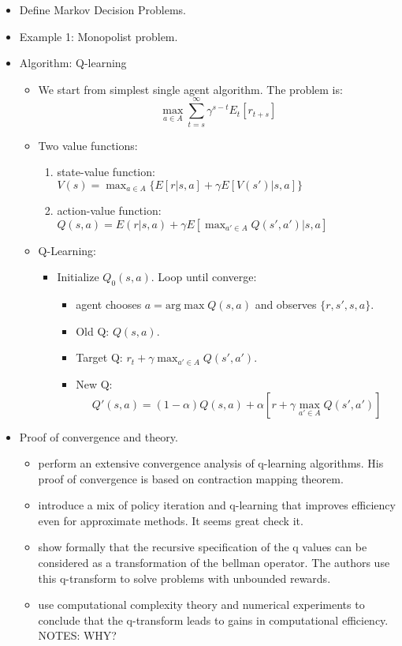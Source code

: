 \documentclass[11pt,english]{article}
\begin{document}
\begin{itemize}
\item Define Markov Decision Problems.
\item Example 1: Monopolist problem.
\item Algorithm: Q-learning
\begin{itemize}
	\item We start from simplest single agent algorithm. The problem is: \medskip
	$$\underset{a \in A}{\max} \sum_{t=s}^{\infty} \gamma^{s-t} E_t[r_{t+s}]$$
	
	\item Two value functions: \medskip
	\begin{enumerate}
		\item state-value function: $V(s)=\max_{a\in A} \{E[r|s,a] + \gamma E[V(s')|s,a] \}$ \medskip
		\item action-value function: $Q(s,a)=E(r|s,a)+\gamma E[\max_{a'\in A} Q(s',a')|s,a]$ \medskip
	\end{enumerate}
	\item Q-Learning:  \medskip
	\begin{itemize}
		\item Initialize $Q_0(s,a)$. Loop until converge:  \medskip
		\begin{itemize}
			\item agent chooses $a= \text{arg} \max Q(s,a)$  and observes $\{r, s'  ,s, a\}$. \medskip
			\item Old Q: $Q(s,a)$. \medskip
			\item  Target Q: $r_t+\gamma \max_{a' \in A} Q(s',a')$. \medskip
			\item New Q: $$Q'(s,a)=(1-\alpha) Q(s,a) +\alpha [r+\gamma \max_{a' \in A} Q(s',a')]$$ \medskip
		\end{itemize}
	\end{itemize}
\end{itemize}
\item Proof of convergence and theory.
\begin{itemize}
\item \citet{tsitsiklis1994} perform an extensive convergence analysis of q-learning algorithms. His proof of convergence is based on contraction mapping theorem.
\item \citet{bertsekas2012} introduce a mix of policy iteration and q-learning
that improves efficiency even for approximate methods. It seems great
check it.
\item \citet{ma2020} show formally that the recursive specification of
the q values can be considered as a transformation of the bellman
operator. The authors use this q-transform to solve problems with
unbounded rewards.
\item \citet{ma2021} use computational complexity theory and numerical
experiments to conclude that the q-transform leads to gains in computational
efficiency. NOTES: WHY?


\end{itemize}
\end{itemize}
\end{document}
